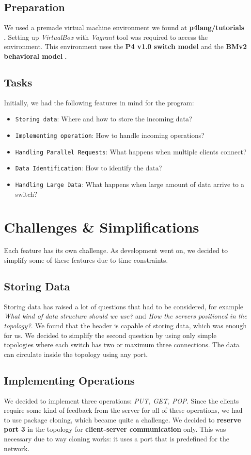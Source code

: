 \documentclass[sigconf,natbib=false]{acmart}
\begin{document}
\subsection{Preparation}
We used a premade virtual machine environment we found at \textbf{p4lang/tutorials} \cite{p4tut}. Setting up \textit{VirtualBox} with  \textit{Vagrant} tool was required to access the environment. This environment uses the \textbf{P4 v1.0 switch model} \cite{v1model} and the \textbf{BMv2 behavioral model} \cite{bmv2}.
\subsection{Tasks}
Initially, we had the following features in mind for the program:
\begin{itemize}
	\item {\verb|Storing data|}: Where and how to store the incoming data?
	\item{\verb|Implementing operation|}: How to handle incoming operations?
	\item{\verb|Handling Parallel Requests|}: What happens when multiple clients connect?
	\item{\verb|Data Identification|}: How to identify the data?
	\item{\verb|Handling Large Data|}: What happens when large amount of data arrive to a switch?
\end{itemize}

\section{Challenges \& Simplifications}
Each feature has its own challenge. As development went on, we decided to simplify some of these features due to time constraints.
\subsection{Storing Data}
Storing data has raised a lot of questions that had to be considered, for example \textit{What kind of data structure should we use?} and \textit{How the servers positioned in the topology?}. We found that the header is capable of storing data, which was enough for us. We decided to simplify the second question by using only simple topologies where each switch has two or maximum three connections. The data can circulate inside the topology using any port.
\subsection{Implementing Operations}
We decided to implement three operations: \textit{PUT, GET, POP}. Since the clients require some kind of feedback from the server for all of these operations, we had to use package cloning, which became quite a challenge. We decided to \textbf{reserve port 3} in the topology for \textbf{client-server communication} only. This was necessary due to way cloning works: it uses a port that is predefined for the network.
\end{document}
